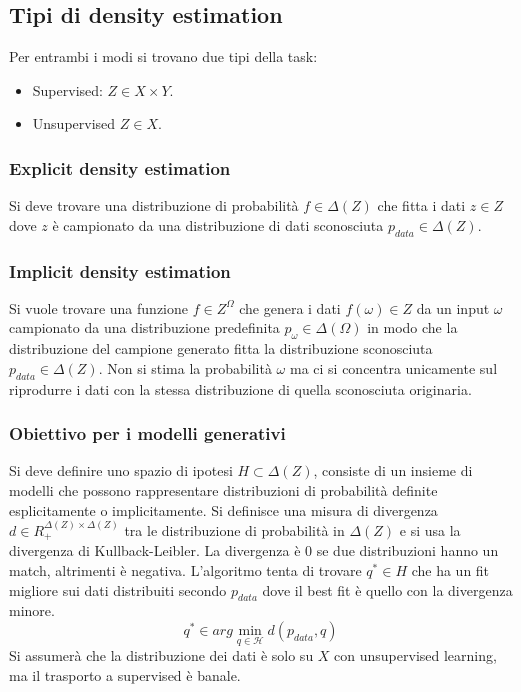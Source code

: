 	\subsection{Tipi di density estimation}
	Per entrambi i modi si trovano due tipi della task:
	\begin{itemize}
		\item Supervised: $Z\in X\times Y$.
		\item Unsupervised $Z\in X$.
	\end{itemize}

		\subsubsection{Explicit density estimation}
		Si deve trovare una distribuzione di probabilit\`a $f\in \Delta(Z)$ che fitta i dati $z\in Z$ dove $z$ \`e campionato da una distribuzione di dati sconosciuta $p_{data}\in\Delta(Z)$.

		\subsubsection{Implicit density estimation}
		Si vuole trovare una funzione $f\in Z^\Omega$ che genera i dati $f(\omega)\in Z$ da un input $\omega$ campionato da una distribuzione predefinita $p_\omega\in\Delta(\Omega)$ in modo che la distribuzione del campione generato fitta la distribuzione sconosciuta $p_{data}\in\Delta(Z)$.
		Non si stima la probabilit\`a $\omega$ ma ci si concentra unicamente sul riprodurre i dati con la stessa distribuzione di quella sconosciuta originaria.

		\subsubsection{Obiettivo per i modelli generativi}
		Si deve definire uno spazio di ipotesi $H\subset \Delta(Z)$, consiste di un insieme di modelli che possono rappresentare distribuzioni di probabilit\`a definite esplicitamente o implicitamente.
		Si definisce una misura di divergenza $d\in R_+^{\Delta(Z)\times\Delta(Z)}$ tra le distribuzione di probabilit\`a in $\Delta(Z)$ e si usa la divergenza di Kullback-Leibler.
		La divergenza \`e $0$ se due distribuzioni hanno un match, altrimenti \`e negativa.
		L'algoritmo tenta di trovare $q^*\in H$ che ha un fit migliore sui dati distribuiti secondo $p_{data}$ dove il best fit \`e quello con la divergenza minore.
		$$q^*\in arg\min\limits_{q\in\mathcal{H}}d(p_{data},q)$$
		Si assumer\`a che la distribuzione dei dati \`e solo su $X$ con unsupervised learning, ma il trasporto a supervised \`e banale.

